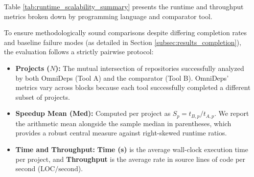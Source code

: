 Table \ref{tab:runtime_scalability_summary} presents the runtime and
throughput metrics broken down by programming language and comparator tool.

To ensure methodologically sound comparisons despite differing completion
rates and baseline failure modes (as detailed in Section
\ref{subsec:results_completion}), the evaluation follows a strictly
pairwise protocol:
\begin{itemize}
  \item \textbf{Projects ($N$):} The mutual intersection of repositories
    successfully analyzed by both OmniDeps (Tool A) and the comparator (Tool
    B). OmniDeps' metrics vary across blocks because each tool
    successfully completed a different subset of projects.
  \item \textbf{Speedup Mean (Med):} Computed per project as $S_p = t_{B, p} /
    t_{A, p}$. We report the arithmetic mean alongside the sample median in
    parentheses, which provides a robust central measure against right-skewed
    runtime ratios.
  \item \textbf{Time and Throughput:} \textbf{Time (s)} is the average
    wall-clock execution time per project, and \textbf{Throughput} is the
    average rate in source lines of code per second ($\text{LOC} /
    \text{second}$).
\end{itemize}

